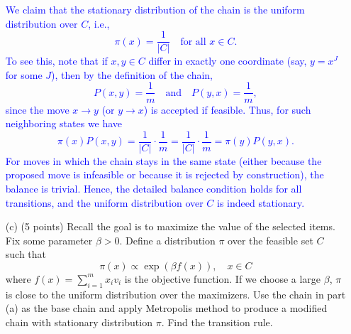 \documentclass{article}
\begin{document}
\begin{itemize}
    \textcolor{blue}{
        We claim that the stationary distribution of the chain is the uniform distribution over \( C \), i.e.,
\[
\pi(x) = \frac{1}{|C|} \quad \text{for all } x \in C.
\]
To see this, note that if \( x,y \in C \) differ in exactly one coordinate (say, \( y = x^J \) for some \( J \)), then by the definition of the chain,
\[
P(x,y) = \frac{1}{m} \quad \text{and} \quad P(y,x) = \frac{1}{m},
\]
since the move \( x \to y \) (or \( y \to x \)) is accepted if feasible. Thus, for such neighboring states we have
\[
\pi(x)P(x,y) = \frac{1}{|C|} \cdot \frac{1}{m} = \frac{1}{|C|} \cdot \frac{1}{m} = \pi(y)P(y,x).
\]
For moves in which the chain stays in the same state (either because the proposed move is infeasible or because it is rejected by construction), the balance is trivial. Hence, the detailed balance condition holds for all transitions, and the uniform distribution over \( C \) is indeed stationary.
    }
    
    \item[(c)] (5 points) Recall the goal is to maximize the value of the selected items. Fix some parameter $\beta > 0$. Define a distribution $\pi$ over the feasible set $C$ such that
    \[
    \pi(x) \propto \exp(\beta f(x)), \quad x \in C
    \]
where $f(x) = \sum_{i=1}^{m} x_i v_i$ is the objective function. If we choose a large $\beta$, $\pi$ is close to the uniform distribution over the maximizers. Use the chain in part (a) as the base chain and apply Metropolis method to produce a modified chain with stationary distribution $\pi$. Find the transition rule.


\end{itemize}
\end{document}
